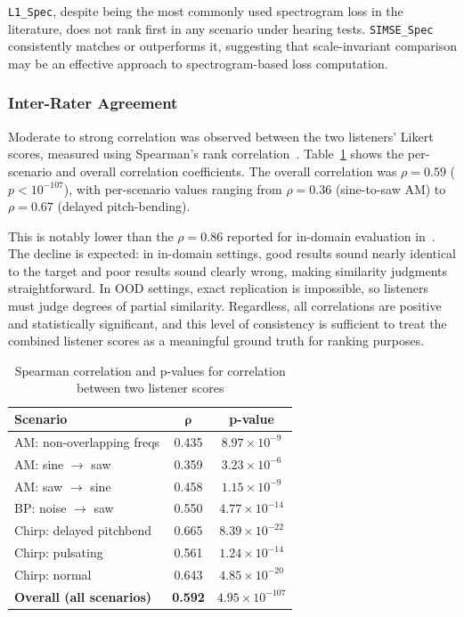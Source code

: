 \documentclass[10pt]{article} %
\newcommand{\SIMSESpec}{\texttt{SIMSE\_\allowbreak Spec}\xspace}
\newcommand{\LoneSpec}{\texttt{L1\_\allowbreak Spec}\xspace}
\begin{document}
\LoneSpec{}, despite being the most commonly used spectrogram loss in the literature, does not rank first in any scenario under hearing tests. \SIMSESpec{} consistently matches or outperforms it, suggesting that scale-invariant comparison may be an effective approach to spectrogram-based loss computation.

\subsubsection{Inter-Rater Agreement}

Moderate to strong correlation was observed between the two listeners' Likert scores, measured using Spearman's rank correlation~\cite{spearman1987proof}. Table~\ref{tab:listener_correlation} shows the per-scenario and overall correlation coefficients. The overall correlation was $\rho = 0.59$ ($p < 10^{-107}$), with per-scenario values ranging from $\rho = 0.36$ (sine-to-saw AM) to $\rho = 0.67$ (delayed pitch-bending).

This is notably lower than the $\rho = 0.86$ reported for in-domain evaluation in~\cite{salimi2025evaluating}. The decline is expected: in in-domain settings, good results sound nearly identical to the target and poor results sound clearly wrong, making similarity judgments straightforward. In OOD settings, exact replication is impossible, so listeners must judge degrees of partial similarity. 
Regardless, all correlations are positive and statistically significant, and this level of consistency is sufficient to treat the combined listener scores as a meaningful ground truth for ranking purposes.

\begin{table}[t]
\centering
\small
\renewcommand{\arraystretch}{1}
\begin{tabular}{|l| c |c|}
\hline
\textbf{Scenario} & $\boldsymbol{\rho}$ & \textbf{p-value} \\
\hline
AM: non-overlapping freqs        & 0.435 & $8.97\times10^{-9}$ \\
AM: sine $\rightarrow$ saw       & 0.359 & $3.23\times10^{-6}$ \\
AM: saw $\rightarrow$ sine       & 0.458 & $1.15\times10^{-9}$ \\
BP: noise $\rightarrow$ saw      & 0.550 & $4.77\times10^{-14}$ \\
Chirp: delayed pitchbend         & 0.665 & $8.39\times10^{-22}$ \\
Chirp: pulsating                 & 0.561 & $1.24\times10^{-14}$ \\
Chirp: normal                    & 0.643 & $4.85\times10^{-20}$ \\
\hline
\textbf{Overall (all scenarios)} & \textbf{0.592} & \textbf{$4.95\times10^{-107}$} \\
\hline
\end{tabular}
\caption{Spearman correlation and p-values for correlation between two listener scores}
\label{tab:listener_correlation}
\end{table}
\end{document}
